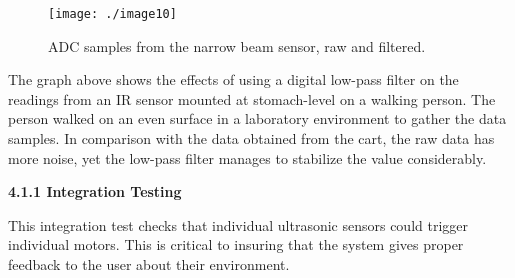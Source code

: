 \begin{figure}[h]
\centering
\texttt{[image: ./image10]}
\caption{ ADC samples from the narrow beam sensor, raw and filtered.}
\label{figure:caseStudyAdcSamples}
\end{figure}

The graph above shows the effects of using a digital low-pass filter on
the readings from an IR sensor mounted at stomach-level on a walking
person. The person walked on an even surface in a laboratory environment
to gather the data samples. In comparison with the data obtained from
the cart, the raw data has more noise, yet the low-pass filter manages
to stabilize the value considerably.




\textbf{4.1.1 Integration Testing}

This integration test checks that individual ultrasonic sensors could
trigger individual motors. This is critical to insuring that the system
gives proper feedback to the user about their environment.


